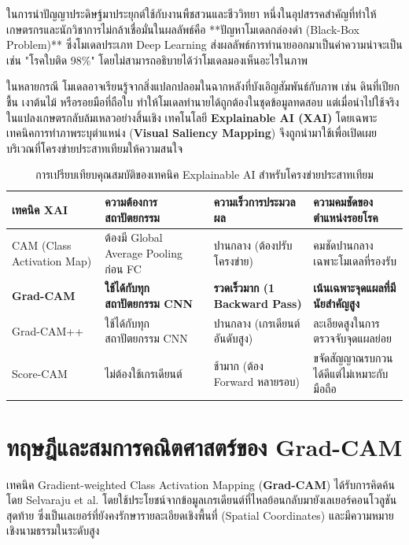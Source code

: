 ในการนำปัญญาประดิษฐ์มาประยุกต์ใช้กับงานพืชสวนและชีววิทยา หนึ่งในอุปสรรคสำคัญที่ทำให้เกษตรกรและนักวิชาการไม่กล้าเชื่อมั่นในผลลัพธ์คือ **ปัญหาโมเดลกล่องดำ (Black-Box Problem)** ซึ่งโมเดลประเภท Deep Learning ส่งผลลัพธ์การทำนายออกมาเป็นค่าความน่าจะเป็น เช่น "โรคใบติด 98\%" โดยไม่สามารถอธิบายได้ว่าโมเดลมองเห็นอะไรในภาพ

ในหลายกรณี โมเดลอาจเรียนรู้จากสิ่งแปลกปลอมในฉากหลังที่บังเอิญสัมพันธ์กับภาพ เช่น ดินที่เปียกชื้น เงาต้นไม้ หรือรอยมือที่ถือใบ ทำให้โมเดลทำนายได้ถูกต้องในชุดข้อมูลทดสอบ แต่เมื่อนำไปใช้จริงในแปลงเกษตรกลับล้มเหลวอย่างสิ้นเชิง เทคโนโลยี \textbf{Explainable AI (XAI)} โดยเฉพาะเทคนิคการทำภาพระบุตำแหน่ง (\textbf{Visual Saliency Mapping}) จึงถูกนำมาใช้เพื่อเปิดเผยบริเวณที่โครงข่ายประสาทเทียมให้ความสนใจ

\begin{table}[H]
\caption{การเปรียบเทียบคุณสมบัติของเทคนิค Explainable AI สำหรับโครงข่ายประสาทเทียม}
\label{tab:ch05_xai_comparison}
\begin{tabularx}{\textwidth}{L{2.4cm}L{2.4cm}L{2.6cm}Y}
\toprule
\textbf{เทคนิค XAI} & \textbf{ความต้องการสถาปัตยกรรม} & \textbf{ความเร็วการประมวลผล} & \textbf{ความคมชัดของตำแหน่งรอยโรค} \\
\midrule
CAM (Class Activation Map) & ต้องมี Global Average Pooling ก่อน FC & ปานกลาง (ต้องปรับโครงข่าย) & คมชัดปานกลางเฉพาะโมเดลที่รองรับ \\
\addlinespace
\textbf{Grad-CAM} & \textbf{ใช้ได้กับทุกสถาปัตยกรรม CNN} & \textbf{รวดเร็วมาก (1 Backward Pass)} & \textbf{เน้นเฉพาะจุดแผลที่มีนัยสำคัญสูง} \\
\addlinespace
Grad-CAM++ & ใช้ได้กับทุกสถาปัตยกรรม CNN & ปานกลาง (เกรเดียนต์อันดับสูง) & ละเอียดสูงในการตรวจจับจุดแผลย่อย \\
\addlinespace
Score-CAM & ไม่ต้องใช้เกรเดียนต์ & ช้ามาก (ต้อง Forward หลายรอบ) & ขจัดสัญญาณรบกวนได้ดีแต่ไม่เหมาะกับมือถือ \\
\bottomrule
\end{tabularx}
\end{table}

\section{ทฤษฎีและสมการคณิตศาสตร์ของ Grad-CAM}

เทคนิค Gradient-weighted Class Activation Mapping (\textbf{Grad-CAM}) ได้รับการคิดค้นโดย Selvaraju et al. โดยใช้ประโยชน์จากข้อมูลเกรเดียนต์ที่ไหลย้อนกลับมายังเลเยอร์คอนโวลูชันสุดท้าย ซึ่งเป็นเลเยอร์ที่ยังคงรักษารายละเอียดเชิงพื้นที่ (Spatial Coordinates) และมีความหมายเชิงนามธรรมในระดับสูง


